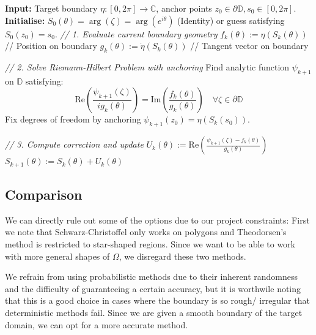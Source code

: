\begin{algorithm}
    \caption{Wegmann's Method}
    \begin{algorithmic}[1]
        \STATE \textbf{Input:} Target boundary $\eta: [0, 2\pi] \to \mathbb{C}$, anchor points $z_0 \in \partial\mathbb{D}, s_0 \in [0, 2\pi]$.
        \STATE \textbf{Initialise:} $S_0(\theta) = \arg(\zeta) = \arg(e^{i\theta})$ (Identity) or guess satisfying $S_0(z_0)=s_0$.
            \STATE \textit{// 1. Evaluate current boundary geometry}
            \STATE $f_k(\theta) := \eta(S_k(\theta))$ \hfill // Position on boundary
            \STATE $g_k(\theta) := \dot\eta(S_k(\theta))$ \hfill // Tangent vector on boundary
            
            \STATE \textit{// 2. Solve Riemann-Hilbert Problem with anchoring}
            \STATE Find analytic function $\psi_{k+1}$ on $\mathbb{D}$ satisfying:
            \begin{equation*}
                \text{Re}\left(\frac{\psi_{k+1}(\zeta)}{i g_k(\theta)}\right) = \text{Im}\left(\frac{f_k(\theta)}{g_k(\theta)}\right) \quad \forall \zeta \in \partial\mathbb{D}
            \end{equation*}
            \STATE Fix degrees of freedom by anchoring $\psi_{k+1}(z_0)=\eta(S_k(s_0))$.

            \STATE \textit{// 3. Compute correction and update}
            \STATE $U_k(\theta) := \text{Re}\left( \frac{\psi_{k+1}(\zeta) - f_k(\theta)}{g_k(\theta)} \right)$
            \STATE $S_{k+1}(\theta) := S_k(\theta) + U_k(\theta)$
        \ENDWHILE
    \end{algorithmic}
\end{algorithm}

\newpage

\subsection{Comparison}
We can directly rule out some of the options due to our project constraints: 
First we note that Schwarz-Christoffel only works on polygons and Theodorsen's method is restricted to star-shaped regions. Since we want to be able to work with more general shapes of $\Omega$, we disregard these two methods.

We refrain from using probabilistic methods due to their inherent randomness and the difficulty of guaranteeing a certain accuracy, but it is worthwile noting that this is a good choice in cases where the boundary is so rough/ irregular that deterministic methods fail.
Since we are given a smooth boundary of the target domain, we can opt for a more accurate method.

